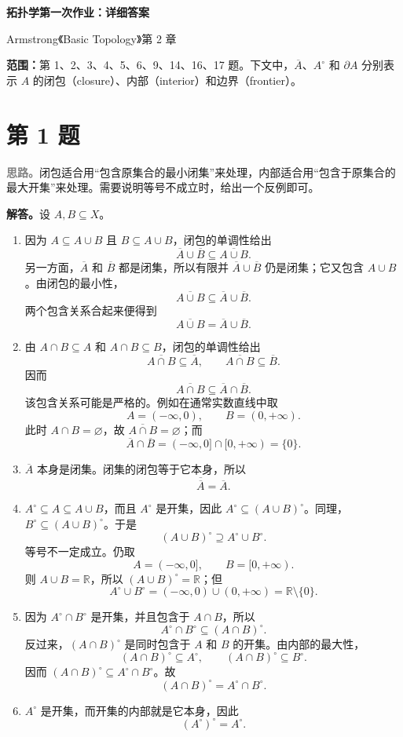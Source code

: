\documentclass[UTF8,a4paper,11pt,fontset=windows]{ctexart}
\newcommand{\problem}[1]{\section*{第 #1 题}}
\newcommand{\idea}{\par\noindent\textcolor{gray}{\textbf{思路。}}}
\newcommand{\solution}{\par\noindent\textbf{解答。}}
\newcommand{\R}{\mathbb R}
\begin{document}
\begin{center}
  {\LARGE\bfseries 拓扑学第一次作业：详细答案}\par\vspace{6pt}
  {\large Armstrong《Basic Topology》第 2 章}
\end{center}

\noindent\textbf{范围：}第 1、2、3、4、5、6、9、14、16、17 题。下文中，$\overline A$、$A^\circ$ 和 $\partial A$ 分别表示 $A$ 的闭包（closure）、内部（interior）和边界（frontier）。

\problem{1}
\idea 闭包适合用“包含原集合的最小闭集”来处理，内部适合用“包含于原集合的最大开集”来处理。需要说明等号不成立时，给出一个反例即可。

\solution 设 $A,B\subseteq X$。
\begin{enumerate}
  \item 因为 $A\subseteq A\cup B$ 且 $B\subseteq A\cup B$，闭包的单调性给出
  \[
    \overline A\cup\overline B\subseteq\overline{A\cup B}.
  \]
  另一方面，$\overline A$ 和 $\overline B$ 都是闭集，所以有限并 $\overline A\cup\overline B$ 仍是闭集；它又包含 $A\cup B$。由闭包的最小性，
  \[
    \overline{A\cup B}\subseteq\overline A\cup\overline B.
  \]
  两个包含关系合起来便得到
  \[
    \overline{A\cup B}=\overline A\cup\overline B.
  \]

  \item 由 $A\cap B\subseteq A$ 和 $A\cap B\subseteq B$，闭包的单调性给出
  \[
    \overline{A\cap B}\subseteq\overline A,
    \qquad
    \overline{A\cap B}\subseteq\overline B.
  \]
  因而
  \[
    \overline{A\cap B}\subseteq\overline A\cap\overline B.
  \]
  该包含关系可能是严格的。例如在通常实数直线中取
  \[
    A=(-\infty,0),\qquad B=(0,+\infty).
  \]
  此时 $A\cap B=\varnothing$，故 $\overline{A\cap B}=\varnothing$；而
  \[
    \overline A\cap\overline B=(-\infty,0]\cap[0,+\infty)=\{0\}.
  \]

  \item $\overline A$ 本身是闭集。闭集的闭包等于它本身，所以
  \[
    \overline{\overline A}=\overline A.
  \]

  \item $A^\circ\subseteq A\subseteq A\cup B$，而且 $A^\circ$ 是开集，因此 $A^\circ\subseteq(A\cup B)^\circ$。同理，$B^\circ\subseteq(A\cup B)^\circ$。于是
  \[
    (A\cup B)^\circ\supseteq A^\circ\cup B^\circ.
  \]
  等号不一定成立。仍取
  \[
    A=(-\infty,0],\qquad B=[0,+\infty).
  \]
  则 $A\cup B=\R$，所以 $(A\cup B)^\circ=\R$；但
  \[
    A^\circ\cup B^\circ=(-\infty,0)\cup(0,+\infty)=\R\setminus\{0\}.
  \]

  \item 因为 $A^\circ\cap B^\circ$ 是开集，并且包含于 $A\cap B$，所以
  \[
    A^\circ\cap B^\circ\subseteq(A\cap B)^\circ.
  \]
  反过来，$(A\cap B)^\circ$ 是同时包含于 $A$ 和 $B$ 的开集。由内部的最大性，
  \[
    (A\cap B)^\circ\subseteq A^\circ,
    \qquad
    (A\cap B)^\circ\subseteq B^\circ.
  \]
  因而 $(A\cap B)^\circ\subseteq A^\circ\cap B^\circ$。故
  \[
    (A\cap B)^\circ=A^\circ\cap B^\circ.
  \]

  \item $A^\circ$ 是开集，而开集的内部就是它本身，因此
  \[
    (A^\circ)^\circ=A^\circ.
  \]
\end{enumerate}
\end{document}
